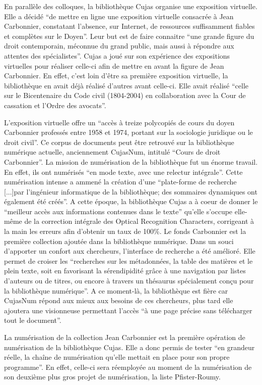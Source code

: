 En parallèle des colloques, la bibliothèque Cujas organise une exposition virtuelle. Elle a décidé \enquote{de mettre en ligne une exposition virtuelle consacrée à Jean Carbonnier, constatant l'absence, sur Internet, de ressources suffisamment fiables et complètes sur le Doyen}. Leur but est de faire connaitre \enquote{une grande figure du droit contemporain, méconnue du grand public, mais aussi à répondre aux attentes des spécialistes}. Cujas a joué sur son expérience des expositions virtuelles pour réaliser celle-ci afin de mettre en avant la figure de Jean Carbonnier. En effet, c'est loin d'être sa première exposition virtuelle, la bibliothèque en avait déjà réalisé d'autres avant celle-ci. Elle avait réalisé \enquote{celle sur le Bicentenaire du Code civil (1804-2004) en collaboration avec la Cour de cassation et l'Ordre des avocats}.

L'exposition virtuelle offre un \enquote{accès à treize polycopiés de cours du doyen Carbonnier professés entre 1958 et 1974, portant sur la sociologie juridique ou le droit civil}. Ce corpus de documents peut être retrouvé sur la bibliothèque numérique actuelle, anciennement CujasNum, intitulé \enquote{Cours de droit Carbonnier}. La mission de numérisation de la bibliothèque fut un énorme travail. En effet, ils ont numérisés \enquote{en mode texte, avec une relectur intégrale}. Cette numérisation intense a ammené la création d'une \enquote{plate-forme de recherche [...]par l'ingénieur informatique de la bibliothèque; des sommaires dynamiques ont également été créés}. A cette époque, la bibliothèque Cujas a à coeur de donner le  \enquote{meilleur accès aux informations contenues dans le texte} qu'elle s'occupe elle-même de la correction intégrale des Optical Recognition Characters, corrigeant à la main les erreurs afin d'obtenir un taux de 100\%. Le fonds Carbonnier est la première collection ajoutée dans la bibliothèque numérique. Dans un souci d'apporter un confort aux chercheurs, l'interface de recherche a été amélioré. Elle permet de croiser les \enquote{recherches sur les métadonnées, la table des matières et le plein texte, soit en favorisant la sérendipidité grâce à une navigation par listes d'auteurs ou de titres, ou encore à travers un thésaurus spécialement conçu pour la bibliothèque numérique}. A ce moment-là, la bibliothèque est fière car CujasNum répond aux mieux aux besoins de ces chercheurs, plus tard elle ajoutera une visionneuse permettant l'accès \enquote{à une page précise sans télécharger tout le document}.

La numérisation de la collection Jean Carbonnier est la première opération de numérisation de la bibliothèque Cujas. Elle a donc permis de tester \enquote{en grandeur réelle, la chaîne de numérisation qu'elle mettait en place pour son propre programme}. En effet, celle-ci sera réemployée au moment de la numérisation de son deuxième plus gros projet de numérisation, la liste Pfister-Roumy.